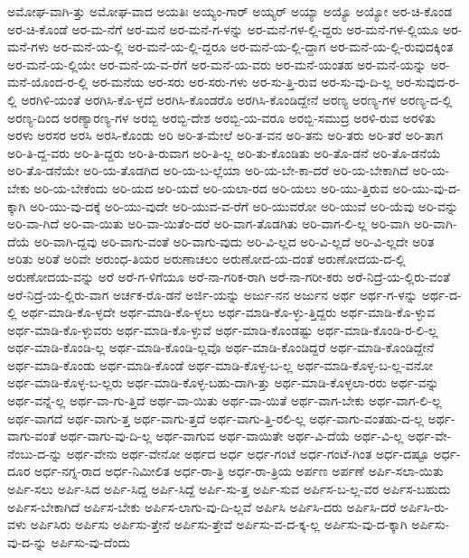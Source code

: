 {ಅಮೋಘ-ವಾಗಿ-ತ್ತು
ಅಮೋಘ-ವಾದ
ಅಯತಿಃ
ಅಯ್ಯಂ-ಗಾರ್
ಅಯ್ಯರ್
ಅಯ್ಯಾ
ಅಯ್ಯೊ
ಅಯ್ಯೋ
ಅರ-ಚಿ-ಕೊಂಡ
ಅರ-ಚಿ-ಕೊಂಡೆ
ಅರ-ಮ-ನೆಗೆ
ಅರ-ಮನೆ
ಅರ-ಮನೆ-ಗ-ಳನ್ನು
ಅರ-ಮನೆ-ಗಳ-ಲ್ಲಿ-ದ್ದರು
ಅರ-ಮನೆ-ಗಳ-ಲ್ಲಿಯೂ
ಅರ-ಮನೆ-ಗಳು
ಅರ-ಮನೆ-ಯ-ಲ್ಲಿ
ಅರ-ಮನೆ-ಯ-ಲ್ಲಿ-ದ್ದರೂ
ಅರ-ಮನೆ-ಯ-ಲ್ಲಿ-ದ್ದಾಗ
ಅರ-ಮನೆ-ಯ-ಲ್ಲಿ-ರುವುದಕ್ಕಿಂತ
ಅರ-ಮನೆ-ಯ-ಲ್ಲಿಯೇ
ಅರ-ಮನೆ-ಯ-ವ-ರೆಗೆ
ಅರ-ಮನೆ-ಯ-ವರು
ಅರ-ಮನೆ-ಯಂತಹ
ಅರ-ಮನೆ-ಯನ್ನು
ಅರ-ಮನೆ-ಯೊಂದ-ರ-ಲ್ಲಿ
ಅರ-ಮನೆಯ
ಅರ-ಸರು
ಅರ-ಸರು-ಗಳು
ಅರ-ಸು-ತ್ತಿ-ರುವ
ಅರ-ಸು-ವು-ದಿ-ಲ್ಲ
ಅರ-ಸುವುದ-ರ-ಲ್ಲಿ
ಅರಗಿಳಿ-ಯಂತೆ
ಅರಗಿಸಿ-ಕೊ-ಳ್ಳದೆ
ಅರಗಿಸಿ-ಕೊಂಡರೊ
ಅರಗಿಸಿ-ಕೊಂಡಿದ್ದೇನೆ
ಅರಣ್ಯ
ಅರಣ್ಯ-ಗಳ
ಅರಣ್ಯ-ದ-ಲ್ಲಿ
ಅರಣ್ಯ-ದಿಂದ
ಅರಣ್ಯಾರಣ್ಯ-ಗಳ
ಅರಬ್ಬಿ
ಅರಬ್ಬಿ-ದೇಶ
ಅರಬ್ಬಿ-ಯ-ವರೂ
ಅರಬ್ಬಿ-ಸಮುದ್ರ
ಅರಳಿ-ರುವ
ಅರಳಿತು
ಅರಳು
ಅರಸರ
ಅರಸಿ
ಅರಸಿ-ಕೊಂಡು
ಅರಿ
ಅರಿ-ತ-ಮೇಲೆ
ಅರಿ-ತ-ವನ
ಅರಿ-ತನು
ಅರಿ-ತರು
ಅರಿ-ತರೆ
ಅರಿ-ತಾಗ
ಅರಿ-ತಿ-ದ್ದ-ವರು
ಅರಿ-ತಿ-ದ್ದರು
ಅರಿ-ತಿ-ರುವಾಗ
ಅರಿ-ತಿ-ಲ್ಲ
ಅರಿ-ತು-ಕೊಂಡಿತು
ಅರಿ-ತೊ-ಡನೆ
ಅರಿ-ತೊ-ಡನೆಯೆ
ಅರಿ-ತೊ-ಡನೆಯೇ
ಅರಿ-ಯ-ತೊಡಗಿದ
ಅರಿ-ಯ-ಬ-ಲ್ಲೆಯಾ
ಅರಿ-ಯ-ಬೇ-ಕಾ-ದರೆ
ಅರಿ-ಯ-ಬೇಕಾಗಿದೆ
ಅರಿ-ಯ-ಬೇಕು
ಅರಿ-ಯ-ಬೇಕೆಂದು
ಅರಿ-ಯದ
ಅರಿ-ಯದೆ
ಅರಿ-ಯಲಾ-ರದ
ಅರಿ-ಯಲು
ಅರಿ-ಯು-ತ್ತಿರುವ
ಅರಿ-ಯು-ವು-ದ-ಕ್ಕಾಗಿ
ಅರಿ-ಯು-ವು-ದಕ್ಕೆ
ಅರಿ-ಯು-ವುದೇ
ಅರಿ-ಯುವ-ವ-ರೆಗೆ
ಅರಿ-ಯುವರೋ
ಅರಿ-ಯುವೆ
ಅರಿ-ಯೆವು
ಅರಿ-ವನ್ನು
ಅರಿ-ವಾ-ಗಿದೆ
ಅರಿ-ವಾ-ಯಿತು
ಅರಿ-ವಾ-ಯಿತೆಂ-ದರೆ
ಅರಿ-ವಾಗ-ತೊಡಗಿತು
ಅರಿ-ವಾಗ-ಲಿ-ಲ್ಲ
ಅರಿ-ವಾಗಿ
ಅರಿ-ವಾಗಿ-ದೆಯೆ
ಅರಿ-ವಾಗಿ-ದ್ದವು
ಅರಿ-ವಾಗು-ವಂತೆ
ಅರಿ-ವಾಗು-ವುದು
ಅರಿ-ವಿ-ಲ್ಲದ
ಅರಿ-ವಿ-ಲ್ಲದೆ
ಅರಿ-ವಿ-ಲ್ಲದೇ
ಅರಿತ
ಅರಿತು
ಅರಿತೆ
ಅರಿವೇ
ಅರುಂಧ-ತಿಯರ
ಅರುಣಾಚಲಂ
ಅರುಣೋದ-ಯ-ದಂತೆ
ಅರುಣೋದಯ-ದ-ಲ್ಲಿ
ಅರುಣೋದಯ-ವನ್ನು
ಅರೆ
ಅರೆ-ಗ-ಳಿಗೆಯೂ
ಅರೆ-ನಾ-ಗರಿಕ-ರಾಗಿ
ಅರೆ-ನಾ-ಗರೀ-ಕರು
ಅರೆ-ನಿದ್ರೆ-ಯ-ಲ್ಲಿರು-ವಂತೆ
ಅರೆ-ನಿದ್ರೆ-ಯ-ಲ್ಲಿರು-ವಾಗ
ಅರ್ಚಕ-ರೊ-ಡನೆ
ಅರ್ಜಿ-ಯನ್ನು
ಅರ್ಜು-ನನ
ಅರ್ಜುನ
ಅರ್ಥ
ಅರ್ಥ-ಗ-ಳನ್ನು
ಅರ್ಥ-ದ-ಲ್ಲಿ
ಅರ್ಥ-ಮಾಡಿ-ಕೊ-ಳ್ಳದೇ
ಅರ್ಥ-ಮಾಡಿ-ಕೊ-ಳ್ಳಲು
ಅರ್ಥ-ಮಾಡಿ-ಕೊ-ಳ್ಳು-ತ್ತಿದ್ದರು
ಅರ್ಥ-ಮಾಡಿ-ಕೊ-ಳ್ಳುವ
ಅರ್ಥ-ಮಾಡಿ-ಕೊ-ಳ್ಳುವರು
ಅರ್ಥ-ಮಾಡಿ-ಕೊ-ಳ್ಳುವೆ
ಅರ್ಥ-ಮಾಡಿ-ಕೊಂಡಷ್ಟು
ಅರ್ಥ-ಮಾಡಿ-ಕೊಂಡಿ-ರ-ಲಿ-ಲ್ಲ
ಅರ್ಥ-ಮಾಡಿ-ಕೊಂಡಿ-ಲ್ಲ
ಅರ್ಥ-ಮಾಡಿ-ಕೊಂಡಿ-ಲ್ಲವೊ
ಅರ್ಥ-ಮಾಡಿ-ಕೊಂಡಿದ್ದರೆ
ಅರ್ಥ-ಮಾಡಿ-ಕೊಂಡಿದ್ದೇನೆ
ಅರ್ಥ-ಮಾಡಿ-ಕೊಂಡು
ಅರ್ಥ-ಮಾಡಿ-ಕೊಂಡೆ
ಅರ್ಥ-ಮಾಡಿ-ಕೊಳ್ಳ-ಬ-ಲ್ಲ
ಅರ್ಥ-ಮಾಡಿ-ಕೊಳ್ಳ-ಬ-ಲ್ಲ-ವನೋ
ಅರ್ಥ-ಮಾಡಿ-ಕೊಳ್ಳ-ಬ-ಲ್ಲರು
ಅರ್ಥ-ಮಾಡಿ-ಕೊಳ್ಳ-ಬಹು-ದಾಗಿ-ತ್ತು
ಅರ್ಥ-ಮಾಡಿ-ಕೊಳ್ಳಲಾ-ರರು
ಅರ್ಥ-ವನ್ನು
ಅರ್ಥ-ವನ್ನೆ-ಲ್ಲ
ಅರ್ಥ-ವಾ-ಗು-ತ್ತಿದೆ
ಅರ್ಥ-ವಾ-ಯಿತು
ಅರ್ಥ-ವಾ-ಯಿತೆ
ಅರ್ಥ-ವಾಗ-ಬೇಕು
ಅರ್ಥ-ವಾಗ-ಲಿ-ಲ್ಲ
ಅರ್ಥ-ವಾಗದೆ
ಅರ್ಥ-ವಾಗು-ತ್ತ
ಅರ್ಥ-ವಾಗು-ತ್ತದೆ
ಅರ್ಥ-ವಾಗು-ತ್ತಿ-ರಲಿ-ಲ್ಲ
ಅರ್ಥ-ವಾಗು-ವಂತಹು-ದ-ಲ್ಲ
ಅರ್ಥ-ವಾಗು-ವಂತೆ
ಅರ್ಥ-ವಾಗು-ವು-ದಿ-ಲ್ಲ
ಅರ್ಥ-ವಾಗುವ
ಅರ್ಥ-ವಾಯಿತೇ
ಅರ್ಥ-ವಿ-ದೆಯೆ
ಅರ್ಥ-ವಿ-ಲ್ಲ
ಅರ್ಥ-ವೇ-ನೆಂಬು-ದ-ನ್ನು
ಅರ್ಥ-ವೇನು
ಅರ್ಥ-ವೇನೋ
ಅರ್ಥದ
ಅರ್ಧ
ಅರ್ಧ-ಗಂಟೆ
ಅರ್ಧ-ಗಂಟೆ-ಗಿಂತ
ಅರ್ಧ-ದಷ್ಟೂ
ಅರ್ಧ-ದೂರ
ಅರ್ಧ-ನಗ್ನ-ರಾದ
ಅರ್ಧ-ನಿಮೀಲಿತ
ಅರ್ಧ-ರಾ-ತ್ರಿ
ಅರ್ಧ-ರಾ-ತ್ರಿಯ
ಅರ್ಪಣ
ಅರ್ಪಣೆ
ಅರ್ಪಿ-ಸಲಾ-ಯಿತು
ಅರ್ಪಿ-ಸಲು
ಅರ್ಪಿ-ಸಿದ
ಅರ್ಪಿ-ಸಿದ್ದ
ಅರ್ಪಿ-ಸಿದ್ದೆ
ಅರ್ಪಿ-ಸು-ತ್ತ
ಅರ್ಪಿ-ಸುವ
ಅರ್ಪಿಸ-ಬ-ಲ್ಲ-ವರ
ಅರ್ಪಿಸ-ಬಹುದು
ಅರ್ಪಿಸ-ಬೇಕಾಗಿದೆ
ಅರ್ಪಿಸ-ಬೇಕು
ಅರ್ಪಿಸ-ಲಾಗು-ವು-ದಿ-ಲ್ಲವೆ
ಅರ್ಪಿಸಿ
ಅರ್ಪಿಸಿ-ದರು
ಅರ್ಪಿಸಿ-ದರೆ
ಅರ್ಪಿಸಿ-ರು-ವಳು
ಅರ್ಪಿಸಿರು
ಅರ್ಪಿಸು
ಅರ್ಪಿಸು-ತ್ತೇನೆ
ಅರ್ಪಿಸು-ತ್ತೇವೆ
ಅರ್ಪಿಸು-ವ-ದ-ಕ್ಕ-ಲ್ಲ
ಅರ್ಪಿಸು-ವು-ದ-ಕ್ಕಾಗಿ
ಅರ್ಪಿಸು-ವು-ದ-ನ್ನು
ಅರ್ಪಿಸು-ವು-ದೆಂದು
}
